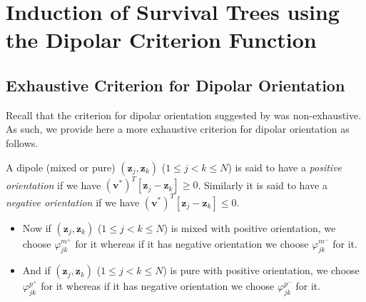 \documentclass[12pt]{amsart}
\theoremstyle{definition}
\theoremstyle{plain}
\theoremstyle{remark}
\begin{document}
\section{Induction of Survival Trees using the Dipolar Criterion Function}


\subsection{Exhaustive Criterion for Dipolar Orientation} %

Recall that the criterion for dipolar orientation suggested by \cite{kretowska} was non-exhaustive. As such, we provide here a more exhaustive criterion for dipolar orientation as follows.

A dipole (mixed or pure) $(\mathbf{z}_j, \mathbf{z}_k)$ ($1 \leq j < k \leq N$) is said to have a \emph{positive orientation} if we have $(\mathbf{v}^\ast)^T [\mathbf{z}_j - \mathbf{z}_k] \geq 0$. Similarly it is said to have a \emph{negative orientation} if we have $(\mathbf{v}^\ast)^T [\mathbf{z}_j - \mathbf{z}_k] \leq 0$.
	
\begin{itemize}

	\item Now if $(\mathbf{z}_j, \mathbf{z}_k)$ ($1 \leq j < k \leq N$) is mixed with positive orientation, we choose $\varphi^{m^+}_{jk}$ for it whereas if it has negative orientation  we choose $\varphi^{m^-}_{jk}$ for it. \\
	
	\item And if $(\mathbf{z}_j, \mathbf{z}_k)$ ($1 \leq j < k \leq N$) is pure with positive orientation, we choose $\varphi^{p^+}_{jk}$ for it whereas if it has negative orientation  we choose $\varphi^{p^-}_{jk}$ for it. \\
	
\end{itemize}








\end{document}
